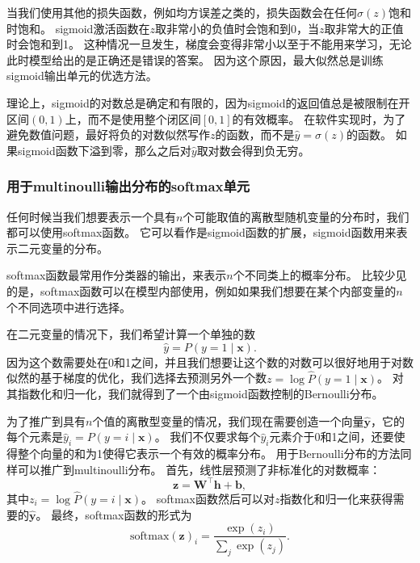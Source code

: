 当我们使用其他的损失函数，例如均方误差之类的，损失函数会在任何$\sigma(z)$饱和时饱和。
sigmoid激活函数在$z$取非常小的负值时会饱和到0，当$z$取非常大的正值时会饱和到1。
这种情况一旦发生，梯度会变得非常小以至于不能用来学习，无论此时模型给出的是正确还是错误的答案。
因为这个原因，最大似然总是训练sigmoid输出单元的优选方法。

理论上，sigmoid的对数总是确定和有限的，因为sigmoid的返回值总是被限制在开区间$(0, 1)$上，而不是使用整个闭区间$[0, 1]$的有效概率。
在软件实现时，为了避免数值问题，最好将负的对数似然写作$z$的函数，而不是$\hat{y}=\sigma(z)$的函数。
如果sigmoid函数下溢到零，那么之后对$\hat{y}$取对数会得到负无穷。

\subsubsection{用于multinoulli输出分布的softmax单元}
\label{sec:softmax_units_for_multinoulli_output_distributions}

任何时候当我们想要表示一个具有$n$个可能取值的离散型随机变量的分布时，我们都可以使用softmax函数。
它可以看作是sigmoid函数的扩展，sigmoid函数用来表示二元变量的分布。


softmax函数最常用作分类器的输出，来表示$n$个不同类上的概率分布。
比较少见的是，softmax函数可以在模型内部使用，例如如果我们想要在某个内部变量的$n$个不同选项中进行选择。

在二元变量的情况下，我们希望计算一个单独的数
\begin{equation}
\hat{y} = P(y=1\mid\bm{x}).
\end{equation}
因为这个数需要处在0和1之间，并且我们想要让这个数的对数可以很好地用于对数似然的基于梯度的优化，我们选择去预测另外一个数$z=\log \hat{P}(y=1\mid\bm{x})$。
对其指数化和归一化，我们就得到了一个由sigmoid函数控制的Bernoulli分布。

为了推广到具有$n$个值的离散型变量的情况，我们现在需要创造一个向量$\hat{\bm{y}}$，它的每个元素是$\hat{y}_i = P(y=i\mid\bm{x})$。
我们不仅要求每个$\hat{y}_i$元素介于0和1之间，还要使得整个向量的和为1使得它表示一个有效的概率分布。
用于Bernoulli分布的方法同样可以推广到multinoulli分布。
首先，线性层预测了非标准化的对数概率：
\begin{equation}
\bm{z} = \bm{W}^\top \bm{h}+\bm{b},
\end{equation}
其中$z_i=\log \hat{P}(y=i\mid\bm{x})$。
softmax函数然后可以对$z$指数化和归一化来获得需要的$\hat{\bm{y}}$。
最终，softmax函数的形式为
\begin{equation}
\text{softmax}(\bm{z})_i = \frac{\exp(z_i)}{\sum_j \exp(z_j)}.
\end{equation}

